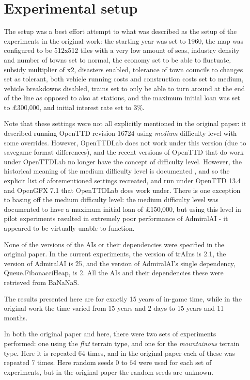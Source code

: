 \documentclass[logo,msc,dsti]{style/infthesis}    %
\begin{document}
{\section{Experimental setup}

The setup was a best effort attempt to what was described as the setup of the experiments in the original work: the starting year was set to 1960, the map was configured to be 512x512 tiles with a very low amount of seas, industry density and number of towns set to normal, the economy set to be able to fluctuate, subsidy multiplier of x2, disasters enabled, tolerance of town councils to changes set as tolerant, both vehicle running costs and construction costs set to medium, vehicle breakdowns disabled, trains set to only be able to turn around at the end of the line as opposed to also at stations, and the maximum initial loan was set to £300,000, and initial interest rate set to 3\%.

Note that these settings were not all explicitly mentioned in the original paper: it described running OpenTTD revision 16724 using \emph{medium} difficulty level with some overrides. However, OpenTTDLab does not work under this version (due to savegame format differences), and the recent versions of OpenTTD that do work under OpenTTDLab no longer have the concept of difficulty level. However, the historical meaning of the medium difficulty level is documented \cite{OpenTTDDifficultyLevels}, and so the explicit list of aforementioned settings recreated, and run under OpenTTD 13.4 and OpenGFX 7.1 that OpenTTDLab does work under. There is one exception to basing off the medium difficulty level: the medium difficulty level was documented to have a maximum initial loan of £150,000, but using this level in pilot experiments resulted in extremely poor performance of AdmiralAI - it appeared to be virtually unable to function.

None of the versions of the AIs or their dependencies were specified in the original paper. In the current experiments, the version of trAIns is 2.1,  the version of AdmiralAI is 25, and the version of AdmiralAI's single dependency, Queue.FibonacciHeap, is 2. All the AIs and their dependencies these were retrieved from BaNaNaS.

The results presented here are for exactly 15 years of in-game time, while in the original work the time varied from 15 years and 2 days to 15 years and 11 months.

In both the original paper and here, there were two sets of experiments performed: one using the \emph{flat} terrain type, and one for the \emph{mountainous} terrain type. Here it is repeated 64 times, and in the original paper each of these was repeated 7 times. Here random seeds 0 to 64 were used for each set of experiments, but in the original paper the random seeds are unknown.

}
\end{document}
